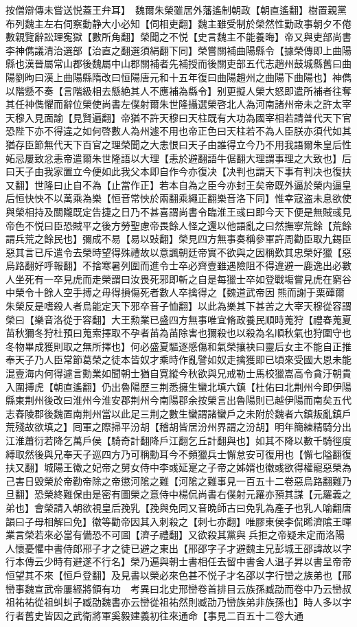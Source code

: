按僧辯傳未嘗送悦蓋王弁耳】　魏爾朱榮雖居外藩遙制朝政【朝直遙翻】樹置親黨布列魏主左右伺察動静大小必知【伺相吏翻】魏主雖受制於榮然性勤政事朝夕不倦數親覽辭訟理寃獄【數所角翻】榮聞之不悦【史言魏主不能養晦】帝又與吏部尚書李神儁議清治選部【治直之翻選須絹翻下同】榮嘗關補曲陽縣令【據榮傳即上曲陽縣也漢晉屬常山郡後魏屬中山郡關補者先補授而後關吏部五代志趙州鼓城縣舊曰曲陽劉昫曰漢上曲陽縣隋改曰恒陽唐元和十五年復曰曲陽趙州之曲陽下曲陽也】神儁以階懸不奏【言階級相去懸絶其人不應補為縣令】别更擬人榮大怒即遣所補者往奪其任神儁懼而辭位榮使尚書左僕射爾朱世隆攝選榮啓北人為河南諸州帝未之許太宰天穆入見面諭【見賢遍翻】帝猶不許天穆曰天柱既有大功為國宰相若請普代天下官恐陛下亦不得違之如何啓數人為州遽不用也帝正色曰天柱若不為人臣朕亦須代如其猶存臣節無代天下百官之理榮聞之大恚恨曰天子由誰得立今乃不用我語爾朱皇后性妬忌屢致忿恚帝遣爾朱世隆語以大理【恚於避翻語牛倨翻大理謂事理之大致也】后曰天子由我家置立今便如此我父本即自作今亦復决【决判也謂天下事有判决也復扶又翻】世隆曰止自不為【止當作正】若本自為之臣今亦封王矣帝既外逼於榮内逼皇后恒快怏不以萬乘為樂【恒音常怏於兩翻乘繩正翻樂音洛下同】惟幸寇盗未息欲使與榮相持及關隴既定告捷之日乃不甚喜謂尚書令臨淮王彧曰即今天下便是無賊彧見帝色不悦曰臣恐賊平之後方勞聖慮帝畏餘人怪之還以他語亂之曰然撫寧荒餘【荒餘謂兵荒之餘民也】彌成不易【易以䜴翻】榮見四方無事奏稱參軍許周勸臣取九錫臣惡其言已斥遣令去榮時望得殊禮故以意諷朝廷帝實不欲與之因稱歎其忠榮好獵【惡烏路翻好呼報翻】不捨寒暑列圍而進令士卒必齊壹雖遇險阻不得違避一鹿逸出必數人坐死有一卒見虎而走榮謂曰汝畏死邪即斬之自是每獵士卒如登戰塲嘗見虎在窮谷中榮令十餘人空手搏之毋得損傷死者數人卒擒得之【魏道武帝因熊而謝于栗磾爾朱榮反是嗜殺人者烏能定天下邪卒音子恤翻】以此為樂其下甚苦之大宰天穆從容謂榮曰【樂音洛從于容翻】大王勲業已盛四方無事唯宜脩政養民順時蒐狩【禮春蒐夏苗秋獮冬狩杜預曰蒐索擇取不孕者苖為苖除害也獮殺也以殺為名順秋氣也狩圍守也冬物畢成獲則取之無所擇也】何必盛夏驅逐感傷和氣榮攘袂曰靈后女主不能自正推奉天子乃人臣常節葛榮之徒本皆奴才乘時作亂譬如奴走擒獲即已頃來受國大恩未能混壹海内何得遽言勳業如聞朝士猶自寛縱今秋欲與兄戒勒士馬校獵嵩高令貪汙朝貴入圍搏虎【朝直遙翻】仍出魯陽歷三荆悉擁生蠻北填六鎮【杜佑曰北荆州今即伊陽縣東荆州後改曰淮州今淮安郡荆州今南陽郡余按榮言出魯陽則已越伊陽而南矣五代志舂陵郡後魏置南荆州當以此足三荆之數生蠻謂諸蠻戶之未附於魏者六鎮叛亂鎮戶荒殘故欲填之】囘軍之際掃平汾胡【稽胡皆居汾州界謂之汾胡】明年簡練精騎分出江淮蕭衍若降乞萬戶侯【騎奇計翻降戶江翻乞丘計翻與也】如其不降以數千騎徑度縛取然後與兄奉天子巡四方乃可稱勳耳今不頻獵兵士懈怠安可復用也【懈七隘翻復扶又翻】城陽王徽之妃帝之舅女侍中李彧延寔之子帝之姊婿也徽彧欲得權寵惡榮為己害日毁榮於帝勸帝除之帝懲河隂之難【河隂之難事見一百五十二卷惡烏路翻難乃旦翻】恐榮終難保由是密有圖榮之意侍中楊侃尚書右僕射元羅亦預其謀【元羅義之弟也】會榮請入朝欲視皇后㝃乳【㝃與免同又音晩師古曰免乳為產子也乳人喻翻唐韻曰子母相解曰免】徽等勸帝因其入刺殺之【刺七亦翻】唯膠東侯李侃晞濟隂王暉業言榮若來必當有備恐不可圖【濟子禮翻】又欲殺其黨與兵拒之帝疑未定而洛陽人懷憂懼中書侍郎郉子才之徒已避之東出【郉邵字子才避魏主兄彭城王邵諱故以字行本傳云少時有避遂不行名】榮乃遍與朝士書相任去留中書舍人温子昇以書呈帝帝恒望其不來【恒戶登翻】及見書以榮必來色甚不悦子才名邵以字行巒之族弟也【邢巒事魏宣武帝屢經將領有功　考異曰北史邢巒卷首排目云族孫臧劭而卷中乃云巒叔祖祐祐從祖虯虯子臧劭魏書亦云巒從祖祐然則臧劭乃巒族弟非族孫也】時人多以字行者舊史皆因之武衛將軍奚毅建義初往來通命【事見二百五十二卷大通